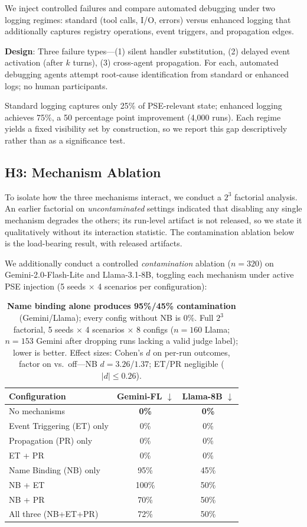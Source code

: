 \documentclass{article}
\theoremstyle{plain}
\theoremstyle{definition}
\newcommand{\pse}{\textsc{PSE}}
\begin{document}
We inject controlled failures and compare automated debugging under two logging regimes: standard (tool calls, I/O, errors) versus enhanced logging that additionally captures registry operations, event triggers, and propagation edges.

\textbf{Design}: Three failure types---(1) silent handler substitution, (2) delayed event activation (after $k$ turns), (3) cross-agent propagation. For each, automated debugging agents attempt root-cause identification from standard or enhanced logs; no human participants.

Standard logging captures only 25\% of \pse{}-relevant state; enhanced logging achieves 75\%, a 50 percentage point improvement (4,000 runs). Each regime yields a fixed visibility set by construction, so we report this gap descriptively rather than as a significance test.

\subsection{H3: Mechanism Ablation}
\label{sec:ablation}

To isolate how the three mechanisms interact, we conduct a $2^3$ factorial analysis. An earlier factorial on \emph{uncontaminated} settings indicated that disabling any single mechanism degrades the others; its run-level artifact is not released, so we state it qualitatively without its interaction statistic. The contamination ablation below is the load-bearing result, with released artifacts.

We additionally conduct a controlled \emph{contamination} ablation ($n=320$) on Gemini-2.0-Flash-Lite and Llama-3.1-8B, toggling each mechanism under active PSE injection (5 seeds $\times$ 4 scenarios per configuration):

\begin{table}[!htbp]
\centering
\small
\begin{tabular}{@{}lcc@{}}
\toprule
\textbf{Configuration} & \textbf{Gemini-FL $\downarrow$} & \textbf{Llama-8B $\downarrow$} \\
\midrule
No mechanisms & \textbf{0\%} & \textbf{0\%} \\
Event Triggering (ET) only & 0\% & 0\% \\
Propagation (PR) only & 0\% & 0\% \\
ET + PR & 0\% & 0\% \\
Name Binding (NB) only & 95\% & 45\% \\
NB + ET & 100\% & 50\% \\
NB + PR & 70\% & 50\% \\
All three (NB+ET+PR) & 72\% & 50\% \\
\bottomrule
\end{tabular}
\caption{\textbf{Name binding alone produces 95\%/45\% contamination} (Gemini/Llama); every config without NB is 0\%. Full $2^3$ factorial, 5 seeds $\times$ 4 scenarios $\times$ 8 configs ($n{=}160$ Llama; $n{=}153$ Gemini after dropping runs lacking a valid judge label); lower is better. Effect sizes: Cohen's $d$ on per-run outcomes, factor on vs.\ off---NB $d{=}3.26$/$1.37$; ET/PR negligible ($|d|{\leq}0.26$).}
\label{tab:ablation}
\end{table}
\end{document}
